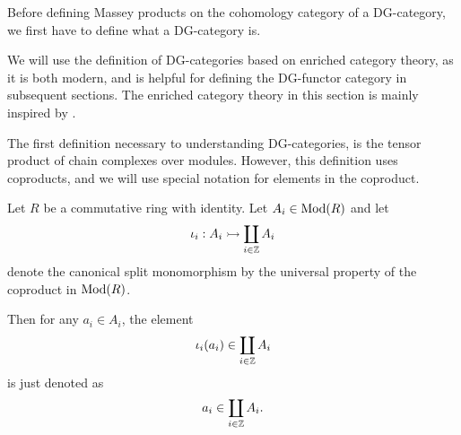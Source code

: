 Before defining Massey products on the cohomology category of a DG-category, we first have to define what a DG-category is.

We will use the definition of DG-categories based on enriched category theory, as it is both modern, and is helpful for defining the DG-functor category in subsequent sections. The enriched category theory in this section is mainly inspired by \cite[Section 6.2]{Borceux_1994}.

The first definition necessary to understanding DG-categories, is the tensor product of chain complexes over modules. However, this definition uses coproducts, and we will use special notation for elements in the coproduct.

\begin{notation}
    \label{not:coprod}
    Let \( R \) be a commutative ring with identity. Let \( A_i \in \operatorname{Mod}(R) \) and let
    \[
        \iota_i: A_i \rightarrowtail \coprod_{i \in {\mathbb{Z}}} A_i
    \]
    denote the canonical split monomorphism by the universal property of the coproduct in \( \operatorname{Mod}(R) \).

    Then for any \( a_i \in A_i \), the element
    \[
        \iota_i(a_i) \in \coprod_{i \in {\mathbb{Z}}} A_i
    \]
    is just denoted as
    \[
        a_i \in \coprod_{i \in {\mathbb{Z}}} A_i.
    \]
    
    

    
\end{notation}

